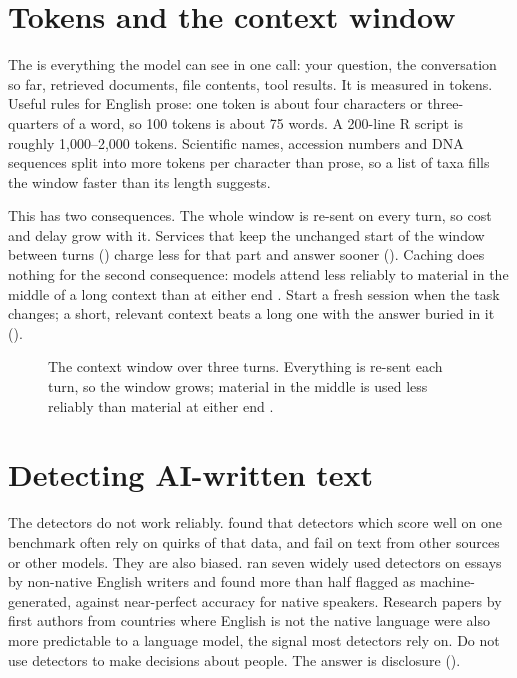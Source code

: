 \section{Tokens and the context window}

The  is everything the model can see in one call: your
question, the conversation so far, retrieved documents, file contents, tool
results. It is measured in tokens. Useful rules for English prose: one token is
about four characters or three-quarters of a word, so 100 tokens is about 75
words. A 200-line R script is roughly 1,000--2,000 tokens. Scientific names,
accession numbers and DNA sequences split into more tokens per character than
prose, so a list of taxa fills the window faster than its length suggests.

This has two consequences. The whole window is re-sent on every turn, so cost
and delay grow with it. Services that keep the unchanged start of the window
between turns () charge less for that part and answer
sooner (). Caching does nothing for the second
consequence: models attend less reliably to material in the middle of a long
context than at either end \parencite{liu2023lostmiddle}. Start a fresh session when the task changes; a
short, relevant context beats a long one with the answer buried in it
().

\begin{figure}[htbp]
\centering
{}
\caption{The context window over three turns. Everything is re-sent each turn,
so the window grows; material in the middle is used less reliably than
material at either end \parencite{liu2023lostmiddle}.}
\label{fig:context}
\end{figure}

\section{Detecting AI-written text}

The detectors do not work reliably. \textcite{pudasaini2026detection} found
that detectors which score well on one benchmark often rely on quirks of that
data, and fail on text from other sources or other models. They are also
biased. \textcite{liang2023detectors} ran seven widely used detectors on essays
by non-native English writers and found more than half flagged as
machine-generated, against near-perfect accuracy for native speakers. Research
papers by first authors from countries where English is not the native
language were also more predictable to a language model, the signal most
detectors rely on. Do not use
detectors to make decisions about people. The answer is disclosure ().

